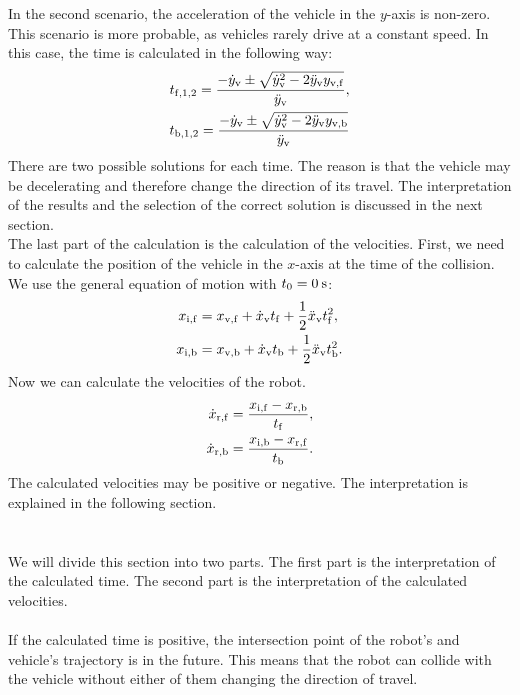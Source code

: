         In the second scenario, the acceleration of the vehicle in the $y$-axis is non-zero. This scenario is more probable, as vehicles rarely drive at a constant speed. In this case, the time is calculated in the following way:
        \begin{align}
            t_{\rm{f},1,2} = \frac{-\dot{y}_{\rm{v}}\pm\sqrt{\dot{y}_{\rm{v}}^2-2\ddot{y}_{\rm{v}}y_{\rm{v,f}}}}{\ddot{y}_{\rm{v}}},\\
            t_{\rm{b},1,2} = \frac{-\dot{y}_{\rm{v}}\pm\sqrt{\dot{y}_{\rm{v}}^2-2\ddot{y}_{\rm{v}}y_{\rm{v,b}}}}{\ddot{y}_{\rm{v}}}
        \end{align}
        There are two possible solutions for each time. The reason is that the vehicle may be decelerating and therefore change the direction of its travel. The interpretation of the results and the selection of the correct solution is discussed in the next section.\\
        The last part of the calculation is the calculation of the velocities. First, we need to calculate the position of the vehicle in the $x$-axis at the time of the collision. We use the general equation of motion with $t_{0}=0\:\rm{s}$:
        \begin{align}
            x_{\rm{i,f}} &= x_{\rm{v,f}} + \dot{x}_{\rm{v}}t_{\rm{f}} + \frac{1}{2}\ddot{x}_{\rm{v}}t_{\rm{f}}^2,\\
            x_{\rm{i,b}} &= x_{\rm{v,b}} + \dot{x}_{\rm{v}}t_{\rm{b}} + \frac{1}{2}\ddot{x}_{\rm{v}}t_{\rm{b}}^2.
        \end{align}
        Now we can calculate the velocities of the robot.
        \begin{align}
            \dot{x}_{\rm{r,f}} &= \frac{x_{\rm{i,f}}-x_{\rm{r,b}}}{t_{\rm{f}}},\\
            \dot{x}_{\rm{r,b}} &= \frac{x_{\rm{i,b}}-x_{\rm{r,f}}}{t_{\rm{b}}}.
        \end{align}
        The calculated velocities may be positive or negative. The interpretation is explained in the following section.\\\\
    \\
        We will divide this section into two parts. The first part is the interpretation of the calculated time. The second part is the interpretation of the calculated velocities.\\\\
        If the calculated time is positive, the intersection point of the robot's and vehicle's trajectory is in the future. This means that the robot can collide with the vehicle without either of them changing the direction of travel.\\
